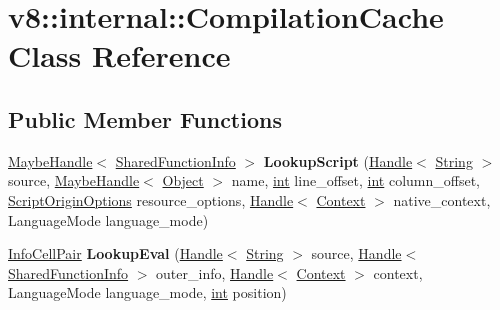 \hypertarget{classv8_1_1internal_1_1CompilationCache}{}\section{v8\+:\+:internal\+:\+:Compilation\+Cache Class Reference}
\label{classv8_1_1internal_1_1CompilationCache}
\subsection*{Public Member Functions}
\begin{DoxyCompactItemize}
\item 
\mbox{\label{classv8_1_1internal_1_1CompilationCache_a2cd1a6db18ad5685c30ba2ebb560bbe2}} 
\mbox{\hyperlink{classv8_1_1internal_1_1MaybeHandle}{Maybe\+Handle}}$<$ \mbox{\hyperlink{classv8_1_1internal_1_1SharedFunctionInfo}{Shared\+Function\+Info}} $>$ {\bfseries Lookup\+Script} (\mbox{\hyperlink{classv8_1_1internal_1_1Handle}{Handle}}$<$ \mbox{\hyperlink{classv8_1_1internal_1_1String}{String}} $>$ source, \mbox{\hyperlink{classv8_1_1internal_1_1MaybeHandle}{Maybe\+Handle}}$<$ \mbox{\hyperlink{classv8_1_1internal_1_1Object}{Object}} $>$ name, \mbox{\hyperlink{classint}{int}} line\+\_\+offset, \mbox{\hyperlink{classint}{int}} column\+\_\+offset, \mbox{\hyperlink{classv8_1_1ScriptOriginOptions}{Script\+Origin\+Options}} resource\+\_\+options, \mbox{\hyperlink{classv8_1_1internal_1_1Handle}{Handle}}$<$ \mbox{\hyperlink{classv8_1_1internal_1_1Context}{Context}} $>$ native\+\_\+context, Language\+Mode language\+\_\+mode)
\item 
\mbox{\label{classv8_1_1internal_1_1CompilationCache_a73a902ce12e3bc8e5ca5276127702478}} 
\mbox{\hyperlink{classv8_1_1internal_1_1InfoCellPair}{Info\+Cell\+Pair}} {\bfseries Lookup\+Eval} (\mbox{\hyperlink{classv8_1_1internal_1_1Handle}{Handle}}$<$ \mbox{\hyperlink{classv8_1_1internal_1_1String}{String}} $>$ source, \mbox{\hyperlink{classv8_1_1internal_1_1Handle}{Handle}}$<$ \mbox{\hyperlink{classv8_1_1internal_1_1SharedFunctionInfo}{Shared\+Function\+Info}} $>$ outer\+\_\+info, \mbox{\hyperlink{classv8_1_1internal_1_1Handle}{Handle}}$<$ \mbox{\hyperlink{classv8_1_1internal_1_1Context}{Context}} $>$ context, Language\+Mode language\+\_\+mode, \mbox{\hyperlink{classint}{int}} position)
\item 

\end{DoxyCompactItemize}
